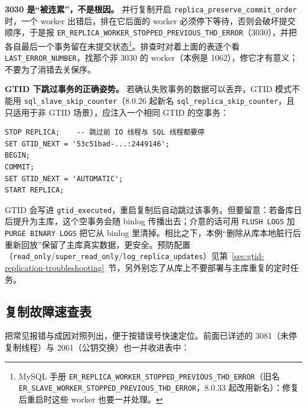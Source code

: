 \documentclass[12pt,UTF8]{ctexbook}
\begin{document}
\textbf{3030 是“被连累”，不是根因。} 并行复制开启 \texttt{replica\_preserve\_commit\_order} 时，一个 worker 出错后，排在它后面的 worker 必须停下等待，否则会破坏提交顺序，于是报 \texttt{ER\_REPLICA\_WORKER\_STOPPED\_PREVIOUS\_THD\_ERROR}（3030），并把各自最后一个事务留在未提交状态\footnote{MySQL 手册 \texttt{ER\_REPLICA\_WORKER\_STOPPED\_PREVIOUS\_THD\_ERROR}（旧名 \texttt{ER\_SLAVE\_WORKER\_STOPPED\_PREVIOUS\_THD\_ERROR}，8.0.33 起改用新名）：修复后重启时这些 worker 也要一并处理。}。排查时对着上面的表逐个看 \texttt{LAST\_ERROR\_NUMBER}，找那个非 3030 的 worker（本例是 1062），修它才有意义；不要为了消错去关保序。

\textbf{GTID 下跳过事务的正确姿势。} 若确认失败事务的数据可以丢弃，GTID 模式不能用 \texttt{sql\_slave\_skip\_counter}（8.0.26 起新名 \texttt{sql\_replica\_skip\_counter}，且只适用于非 GTID 场景），应注入一个相同 GTID 的空事务：
\begin{lstlisting}
STOP REPLICA;    -- 跳过前 IO 线程与 SQL 线程都要停
SET GTID_NEXT = '53c51bad-...:2449146';
BEGIN;
COMMIT;
SET GTID_NEXT = 'AUTOMATIC';
START REPLICA;
\end{lstlisting}
GTID 会写进 \texttt{gtid\_executed}，重启复制后自动跳过该事务。但要留意：若备库日后提升为主库，这个空事务会随 binlog 传播出去；介意的话可用 \texttt{FLUSH LOGS} 加 \texttt{PURGE BINARY LOGS} 把它从 binlog 里清掉。相比之下，本例“删除从库本地脏行后重新回放”保留了主库真实数据，更安全。预防配置（\texttt{read\_only}/\texttt{super\_read\_only}/\texttt{log\_replica\_updates}）见第~\ref{sec:gtid-replication-troubleshooting}~节，另外别忘了从库上不要部署与主库重复的定时任务。

\subsection{复制故障速查表}

把常见报错与成因对照列出，便于按错误号快速定位。前面已详述的 3081（未停复制线程）与 2061（公钥交换）也一并收进表中：
\end{document}
